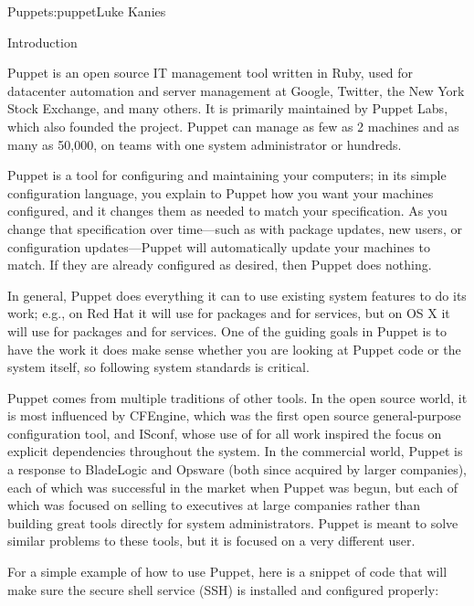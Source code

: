 \begin{aosachapter}{Puppet}{s:puppet}{Luke Kanies}

\begin{aosasect1}{Introduction}

Puppet is an open source IT management tool written in Ruby, used for
datacenter automation and server management at Google, Twitter, the
New York Stock Exchange, and many others. It is primarily maintained
by Puppet Labs, which also founded the project.  Puppet can manage as
few as 2 machines and as many as 50,000, on teams with one system
administrator or hundreds.

Puppet is a tool for configuring and maintaining your computers; in
its simple configuration language, you explain to Puppet how you want
your machines configured, and it changes them as needed to match your
specification.  As you change that specification over time---such as
with package updates, new users, or configuration updates---Puppet
will automatically update your machines to match.  If they are already
configured as desired, then Puppet does nothing.

In general, Puppet does everything it can to use existing system
features to do its work; e.g., on Red Hat it will use  for packages and
 for services, but on OS X it will use  for packages and
 for services.  One of the guiding goals in Puppet is to have
the work it does make sense whether you are looking at Puppet code or
the system itself, so following system standards is critical.

Puppet comes from multiple traditions of other tools.  In the open
source world, it is most influenced by CFEngine, which was the first
open source general-purpose configuration tool, and ISconf, whose use
of  for all work inspired the focus on explicit dependencies
throughout the system.  In the commercial world, Puppet is a response
to BladeLogic and Opsware (both since acquired by larger companies),
each of which was successful in the market when Puppet was begun, but
each of which was focused on selling to executives at large companies
rather than building great tools directly for system administrators.
Puppet is meant to solve similar problems to these tools, but it is
focused on a very different user.

For a simple example of how to use Puppet, here is a snippet of code
that will make sure the secure shell service (SSH) is installed and
configured properly:


\end{aosasect1}
\end{aosachapter}
